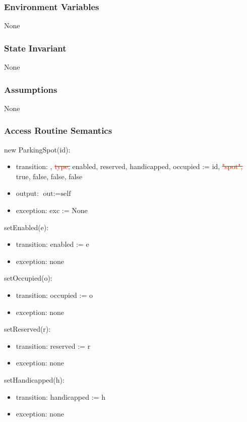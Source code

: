 \documentclass[12pt, titlepage]{article}
\begin{document}
\subsubsection{Environment Variables}
None

\subsubsection{State Invariant}
None

\subsubsection{Assumptions}
None

\subsubsection{Access Routine Semantics}

\noindent new ParkingSpot($\text{id}$):
\begin{itemize}
\item transition: , \textcolor{red}{\st{type,}} enabled, reserved,
handicapped, occupied := id, \textcolor{red}{\st{"spot",}} \\
true, false, false, false
\item output: $\text{out} := \text{self}$
\item exception: exc := None
\end{itemize}

\noindent setEnabled(e):
\begin{itemize} 
\item transition: enabled := e
\item exception: none
\end{itemize}

\noindent setOccupied(o):
\begin{itemize} 
\item transition: occupied := o
\item exception: none
\end{itemize}

\noindent setReserved(r):
\begin{itemize} 
\item transition: reserved := r
\item exception: none
\end{itemize}

\noindent setHandicapped(h):
\begin{itemize} 
\item transition: handicapped := h
\item exception: none
\end{itemize}
\end{document}
